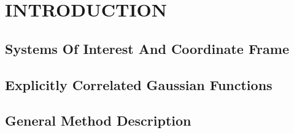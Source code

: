\chapter{INTRODUCTION\label{chap1}}

\section{Systems Of Interest And Coordinate Frame}

\section{Explicitly Correlated Gaussian Functions}

\section{General Method Description}


